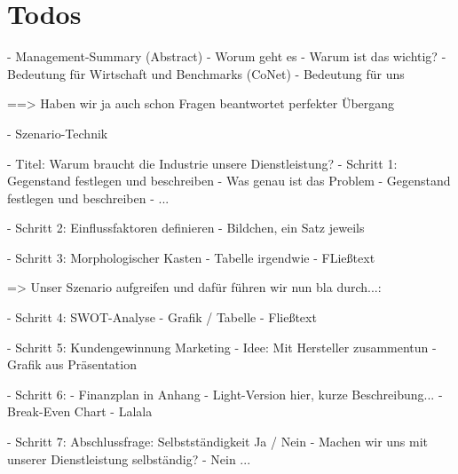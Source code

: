 \section{Todos}

- Management-Summary (Abstract)
	- Worum geht es 
	- Warum ist das wichtig?
	- Bedeutung für Wirtschaft und Benchmarks (CoNet)
	- Bedeutung für uns
	
	==> Haben wir ja auch schon Fragen beantwortet perfekter Übergang
	
- Szenario-Technik

	- Titel: Warum braucht die Industrie unsere Dienstleistung?
	- Schritt 1: Gegenstand festlegen und beschreiben
		- Was genau ist das Problem
		- Gegenstand festlegen und beschreiben
		- ...
		
	- Schritt 2: Einflussfaktoren definieren
		- Bildchen, ein Satz jeweils
		
	- Schritt 3: Morphologischer Kasten
		- Tabelle irgendwie
		- FLießtext
		
	=> Unser Szenario aufgreifen und dafür führen wir nun bla durch...:
		
	- Schritt 4: SWOT-Analyse
		- Grafik / Tabelle 
		- Fließtext
		
	- Schritt 5: Kundengewinnung Marketing
		- Idee: Mit Hersteller zusammentun
		- Grafik aus Präsentation
		
	- Schritt 6: 
		- Finanzplan in Anhang
		- Light-Version hier, kurze Beschreibung...
		- Break-Even Chart 
		- Lalala
	
	- Schritt 7: Abschlussfrage: Selbstständigkeit Ja / Nein
	- Machen wir uns mit unserer Dienstleistung selbständig?
		- Nein ...
